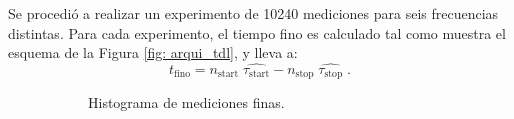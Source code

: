 Se procedió a realizar un experimento de 10240 mediciones para seis frecuencias distintas.
Para cada experimento, el tiempo fino es calculado tal como muestra el esquema de la Figura \ref{fig: arqui_tdl}, y lleva a:
\begin{equation}
     t_\text{fino} = n_\text{start} \; \hat{\tau_\text{start}} - n_\text{stop} \; \hat{\tau_\text{stop}} \; .
     \label{eq: t_fino}
\end{equation}
\begin{figure}[H]
     \centering
     \begin{subfigure}[t]{0.45\textwidth} %
           \centering
           \caption{Histograma de mediciones finas.}
           \label{fig: histograma_66}
     \end{subfigure}%
     \hspace{10pt}%
     \begin{subfigure}[t]{0.45\textwidth} %
           \centering
\end{subfigure}
\end{figure}
